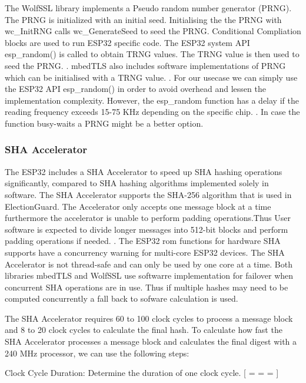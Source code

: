 The WolfSSL library implements a Pseudo random number generator (PRNG). The PRNG is initialized with an initial seed. Initialising the the PRNG with wc_InitRNG calls wc_GenerateSeed to seed the PRNG. Conditional Compliation blocks are used to run ESP32 specific code. The ESP32 system API esp_random() is called to obtain TRNG values. The TRNG value is then used to seed the PRNG. \cite{esp32-ref}. mbedTLS also includes software implementations of PRNG which can be initialised with a TRNG value. \cite{esp32-ref}. For our usecase we can simply use the ESP32 API esp_random() in order to avoid overhead and lessen the implementation complexity. However, the esp_random function has a delay if the reading frequency exceeds 15-75 KHz depending on the specific chip. \cite{esp32-ref}. In case the function busy-waits a PRNG might be a better option. 


\subsubsection{SHA Accelerator}
The ESP32 includes a SHA Accelerator to speed up SHA hashing operations significantly, compared to SHA hashing algorithms implemented solely in software. \cite[589]{esp32-ref} The SHA Accelerator supports the SHA-256 algorithm that is used in ElectionGuard. The Accelerator only accepts one message block at a time furthermore the accelerator is unable to perform padding operations.Thus User software is expected to divide longer messages into 512-bit blocks and perform padding operations if needed. \cite[2]{esp32-series}. The ESP32 rom functions for hardware SHA supports have a concurrency warning for multi-core ESP32 devices. The SHA Accelerator is not thread-safe and can only be used by one core at a time. Both libraries mbedTLS and WolfSSL use softwarre implementation for failover when concurrent SHA operations are in use. Thus if multiple hashes may need to be computed concurrently a fall back to sofware calculation is used.


The SHA Accelerator requires 60 to 100 clock cycles to process a message block and 8 to 20 clock cycles to calculate the final hash. To calculate how fast the SHA Accelerator processes a message block and calculates the final digest with a 240 MHz processor, we can use the following steps:

Clock Cycle Duration: Determine the duration of one clock cycle. [  =  =  =    ]

